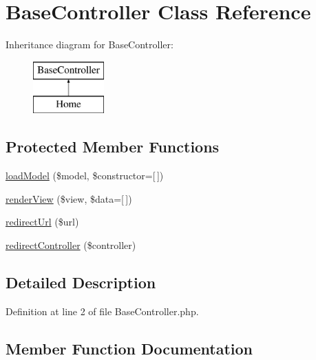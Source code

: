 \hypertarget{class_base_controller}{}\section{Base\+Controller Class Reference}
\label{class_base_controller}
Inheritance diagram for Base\+Controller\+:\begin{figure}[H]
\begin{center}
\leavevmode
\includegraphics[height=2.000000cm]{class_base_controller}
\end{center}
\end{figure}
\subsection*{Protected Member Functions}
\begin{DoxyCompactItemize}
\item 
\hyperlink{class_base_controller_a5fa8890bd3a9d20f5c0cc2377dc49eb1}{load\+Model} (\$model, \$constructor=\mbox{[}$\,$\mbox{]})
\item 
\hyperlink{class_base_controller_aa0c49b95cd8e5ff8ff61b4a2c35bf1eb}{render\+View} (\$view, \$data=\mbox{[}$\,$\mbox{]})
\item 
\hyperlink{class_base_controller_a9f95c7503770ed9c974005b363ec3d00}{redirect\+Url} (\$url)
\item 
\hyperlink{class_base_controller_a85ddb683efc64655be063b697f631beb}{redirect\+Controller} (\$controller)
\end{DoxyCompactItemize}


\subsection{Detailed Description}


Definition at line 2 of file Base\+Controller.\+php.



\subsection{Member Function Documentation}
\hypertarget{class_base_controller_a5fa8890bd3a9d20f5c0cc2377dc49eb1}{}\label{class_base_controller_a5fa8890bd3a9d20f5c0cc2377dc49eb1} 
